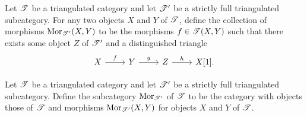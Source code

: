 \documentclass[dissertation.tex]{subfiles}
\begin{document}
\begin{defn}
  Let $\mathscr{T}$ be a triangulated category and let $\mathscr{T}^\prime$ be a strictly full triangulated subcategory.
  For any two objects $X$ and $Y$ of $\mathscr{T}$, define the collection of morphisms $\operatorname{Mor}_{\mathscr{T}^\prime}(X,Y)$ to be the morphisms $f \in \mathscr{T}(X,Y)$ such that there exists some object $Z$ of $\mathscr{T}^\prime$ and a distinguished triangle
  $$\begin{tikzcd}
    X \arrow{r}{f} & Y \arrow{r}{g} & Z \arrow{r}{h} & X[1].
  \end{tikzcd}$$
\end{defn}

\begin{defn}
  Let $\mathscr{T}$ be a triangulated category and let $\mathscr{T}^\prime$ be a strictly full triangulated subcategory.
  Define the subcategory $\operatorname{Mor}_{\mathscr{T}^\prime}$ of $\mathscr{T}$ to be the category with objects those of $\mathscr{T}$ and morphisms $\operatorname{Mor}_{\mathscr{T}^\prime}(X,Y)$ for objects $X$ and $Y$ of $\mathscr{T}$.
\end{defn}
\end{document}
